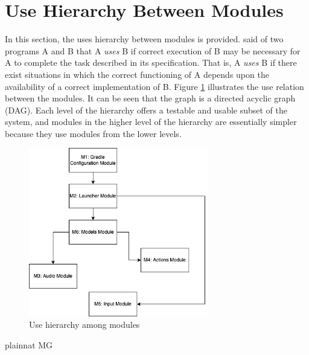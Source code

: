 \documentclass[12pt, titlepage]{article}
\begin{document}
\section{Use Hierarchy Between Modules} \label{SecUse}

In this section, the uses hierarchy between modules is
provided. \citet{Parnas1978} said of two programs A and B that A {\em uses} B if
correct execution of B may be necessary for A to complete the task described in
its specification. That is, A {\em uses} B if there exist situations in which
the correct functioning of A depends upon the availability of a correct
implementation of B.  Figure \ref{FigUH} illustrates the use relation between
the modules. It can be seen that the graph is a directed acyclic graph
(DAG). Each level of the hierarchy offers a testable and usable subset of the
system, and modules in the higher level of the hierarchy are essentially simpler
because they use modules from the lower levels.

\begin{figure}[H]
\centering
\includegraphics[width=0.7\textwidth]{Use Hierarchy Between Modules.png}
\caption{Use hierarchy among modules}
\label{FigUH}
\end{figure}


 {plainnat}
 {MG}
\end{document}
